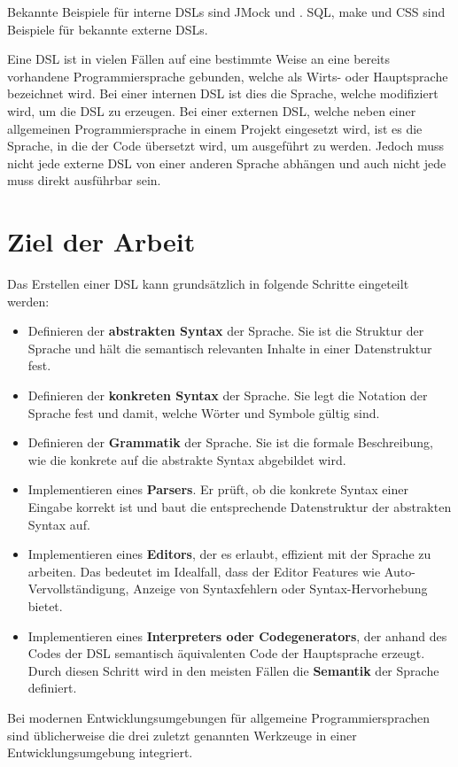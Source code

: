 Bekannte Beispiele für interne DSLs sind JMock und . SQL, make und CSS sind Beispiele für bekannte externe DSLs.

Eine DSL ist in vielen Fällen auf eine bestimmte Weise an eine bereits vorhandene Programmiersprache gebunden, welche als Wirts- oder Hauptsprache bezeichnet wird. Bei einer internen DSL ist dies die Sprache, welche modifiziert wird, um die DSL zu erzeugen. Bei einer externen DSL, welche neben einer allgemeinen Programmiersprache in einem Projekt eingesetzt wird, ist es die Sprache, in die der Code übersetzt wird, um ausgeführt zu werden.
Jedoch muss nicht jede externe DSL von einer anderen Sprache abhängen und auch nicht jede muss direkt ausführbar sein\cite{paper:Mernik}.

\section{Ziel der Arbeit}\label{sct:ziel}
Das Erstellen einer DSL kann grundsätzlich in folgende Schritte eingeteilt werden:
\begin{itemize}
	\item Definieren der \textbf{abstrakten Syntax} der Sprache. Sie ist die Struktur der Sprache und hält die semantisch relevanten Inhalte in einer Datenstruktur fest\cite{www:heise}.
	\item Definieren der \textbf{konkreten Syntax} der Sprache. Sie legt die Notation der Sprache fest und damit, welche Wörter und Symbole gültig sind.
	\item Definieren der \textbf{Grammatik} der Sprache. Sie ist die formale Beschreibung, wie die konkrete auf die abstrakte Syntax abgebildet wird\cite{www:heise}.
	\item Implementieren eines \textbf{Parsers}. Er prüft, ob die konkrete Syntax einer Eingabe korrekt ist und baut die entsprechende Datenstruktur der abstrakten Syntax auf. 
	\item Implementieren eines \textbf{Editors}, der es erlaubt, effizient mit der Sprache zu arbeiten. Das bedeutet im Idealfall, dass der Editor Features wie Auto-Vervollständigung, Anzeige von Syntaxfehlern oder Syntax-Hervorhebung bietet.
	\item Implementieren eines \textbf{Interpreters oder Codegenerators}, der anhand des Codes der DSL semantisch äquivalenten Code der Hauptsprache erzeugt. Durch diesen Schritt wird in den meisten Fällen die \textbf{Semantik} der Sprache definiert.
\end{itemize}
Bei modernen Entwicklungsumgebungen für allgemeine Programmiersprachen sind üblicherweise die drei zuletzt genannten Werkzeuge in einer Entwicklungsumgebung integriert.

